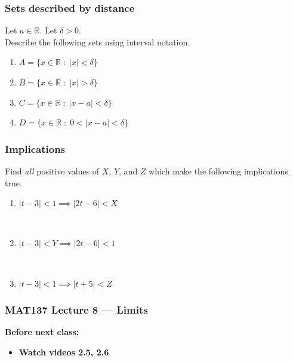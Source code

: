 \documentclass[14pt]{beamer}
\newcommand {\DS} [1] {${\displaystyle #1}$}
\newcommand {\R}{\mathbb{R}}
\begin{document}
\begin{frame}
\frametitle{Sets described by distance}


Let $a \in \R$.  Let $\delta >0$.  \\
Describe the following sets using interval notation.

\begin{enumerate}
	\item  \DS{A = \{x \in \R \; : \; |x| < \delta\} }
	\item  \DS{B = \{x \in \R \; : \; |x| > \delta\} }
	\item  \DS{C = \{x \in \R \; : \; |x-a| < \delta\} }
	\item  \DS{D = \{x \in \R \; : \; 0 < |x-a| < \delta\} }
\end{enumerate}


\end{frame}
\begin{frame}
\frametitle{Implications}

Find \emph{all} positive values of $X$, $Y$, and $Z$ which make the following implications true.

\vfill
\begin{enumerate}
	\item  \DS{| t-3 | <  1  \implies |2t-6| < X}
	
		\

	\item   \DS{|t-3| < Y \implies |2t-6| < 1}

		\

	\item  \DS{|t-3| < 1 \implies |t+5| < Z}
\end{enumerate}
\vfill

\end{frame}


\begin{frame}
\frametitle{MAT137 Lecture 8 --- Limits}
	\vfill
	{\bf Before next class:}
		\begin{itemize} \normalsize
			\item {\bf Watch videos 2.5, 2.6 }
		\end{itemize}
	\vfill

\end{frame}
\end{document}

